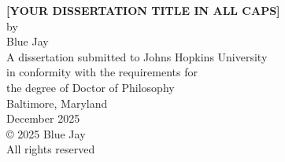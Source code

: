 \begin{titlepage}
\thispagestyle{empty}
\begin{center}
    \doublespacing
    \vspace*{1.5in} 
    {\bf \Large [YOUR DISSERTATION TITLE IN ALL CAPS]} \\ 
    \vfill 
    {\Large by} \\ 
    {\Large Blue Jay}\\ 
    \vfill 
    {\large A dissertation submitted to Johns Hopkins University\\ in conformity with the requirements for\\ the degree of Doctor of Philosophy\\} 
    \vfill 
    {\large Baltimore, Maryland} \\ 
    {\large December 2025} \\ 
    \vfill
    {\large \copyright{} 2025 Blue Jay } \\ 
    {\large All rights reserved} \\ 
    \vfill
\end{center}
\newpage  
\end{titlepage}

